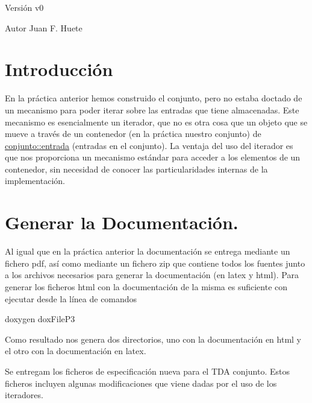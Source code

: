 \begin{DoxyVersion}{Versión}
v0 
\end{DoxyVersion}
\begin{DoxyAuthor}{Autor}
Juan F. Huete
\end{DoxyAuthor}
\hypertarget{index_intro_sec}{}\section{Introducción}\label{index_intro_sec}
En la práctica anterior hemos construido el conjunto, pero no estaba doctado de un mecanismo para poder iterar sobre las entradas que tiene almacenadas. Este mecanismo es esencialmente un iterador, que no es otra cosa que un objeto que se mueve a través de un contenedor (en la práctica nuestro conjunto) de \hyperlink{classconjunto_a09cad766dd65de73e51eae21f9d22585}{conjunto\+::entrada} (entradas en el conjunto). La ventaja del uso del iterador es que nos proporciona un mecanismo estándar para acceder a los elementos de un contenedor, sin necesidad de conocer las particularidades internas de la implementación.\hypertarget{index_doc}{}\section{Generar la Documentación.}\label{index_doc}
Al igual que en la práctica anterior la documentación se entrega mediante un fichero pdf, así como mediante un fichero zip que contiene todos los fuentes junto a los archivos necesarios para generar la documentación (en latex y html). Para generar los ficheros html con la documentación de la misma es suficiente con ejecutar desde la línea de comandos


\begin{DoxyCode}
doxygen doxFileP3
\end{DoxyCode}


Como resultado nos genera dos directorios, uno con la documentación en html y el otro con la documentación en latex.

Se entregam los ficheros de especificación nueva para el T\+D\+A conjunto. Estos ficheros incluyen algunas modificaciones que viene dadas por el uso de los iteradores.

